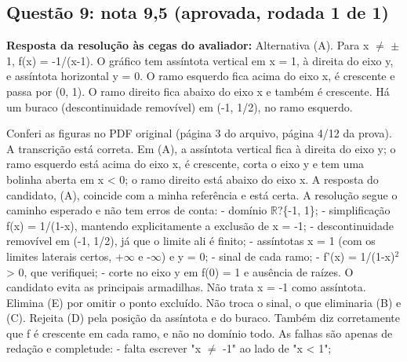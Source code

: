 \documentclass{article}%
\begin{document}
\subsection*{Questão 9: nota 9,5 (aprovada, rodada 1 de 1)}%
\textbf{Resposta da resolução às cegas do avaliador:} Alternativa (A). Para x $\neq$ $\pm$1, f(x) = -1/(x-1). O gráfico tem assíntota vertical em x = 1, à direita do eixo y, e assíntota horizontal y = 0. O ramo esquerdo fica acima do eixo x, é crescente e passa por (0, 1). O ramo direito fica abaixo do eixo x e também é crescente. Há um buraco (descontinuidade removível) em (-1, 1/2), no ramo esquerdo.\par %
Conferi as figuras no PDF original (página 3 do arquivo, página 4/12 da prova). A transcrição está correta. Em (A), a assíntota vertical fica à direita do eixo y; o ramo esquerdo está acima do eixo x, é crescente, corta o eixo y e tem uma bolinha aberta em x < 0; o ramo direito está abaixo do eixo x. A resposta do candidato, (A), coincide com a minha referência e está certa.\newline%
\newline%
A resolução segue o caminho esperado e não tem erros de conta:\newline%
{-} domínio $\mathbb{R}$?\{-1, 1\};\newline%
{-} simplificação f(x) = 1/(1-x), mantendo explicitamente a exclusão de x = -1;\newline%
{-} descontinuidade removível em (-1, 1/2), já que o limite ali é finito;\newline%
{-} assíntotas x = 1 (com os limites laterais certos, +$\infty$ e -$\infty$) e y = 0;\newline%
{-} sinal de cada ramo;\newline%
{-} f'(x) = 1/(1-x)$^2$ > 0, que verifiquei;\newline%
{-} corte no eixo y em f(0) = 1 e ausência de raízes.\newline%
\newline%
O candidato evita as principais armadilhas. Não trata x = -1 como assíntota. Elimina (E) por omitir o ponto excluído. Não troca o sinal, o que eliminaria (B) e (C). Rejeita (D) pela posição da assíntota e do buraco. Também diz corretamente que f é crescente em cada ramo, e não no domínio todo.\newline%
\newline%
As falhas são apenas de redação e completude:\newline%
{-} falta escrever "x $\neq$ -1" ao lado de "x < 1";\newline%
\end{document}
